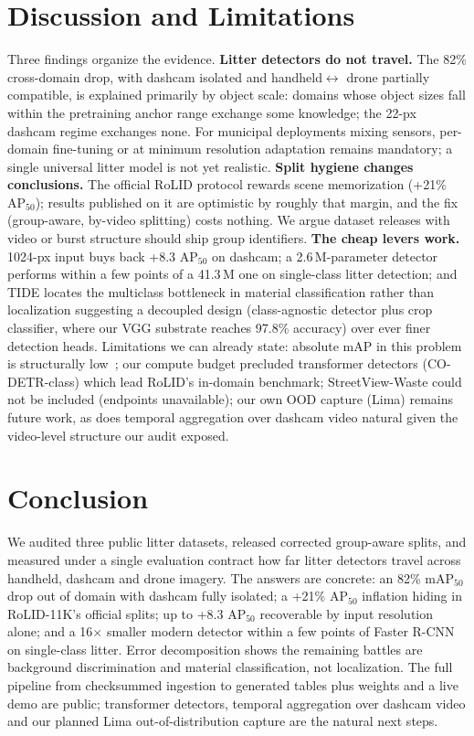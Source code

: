 \documentclass[conference]{IEEEtran}
\begin{document}
\section{Discussion and Limitations}
Three findings organize the evidence. \textbf{Litter detectors do not travel.}
The 82\% cross-domain drop, with dashcam isolated and handheld$\leftrightarrow$
drone partially compatible, is explained primarily by object scale: domains
whose object sizes fall within the pretraining anchor range exchange some
knowledge; the 22-px dashcam regime exchanges none. For municipal deployments
mixing sensors, per-domain fine-tuning or at minimum resolution
adaptation remains mandatory; a single universal litter model is not yet
realistic. \textbf{Split hygiene changes conclusions.} The official RoLID
protocol rewards scene memorization (+21\% AP$_{50}$); results published on it
are optimistic by roughly that margin, and the fix (group-aware, by-video
splitting) costs nothing. We argue dataset releases with video or burst
structure should ship group identifiers. \textbf{The cheap levers work.}
1024-px input buys back +8.3 AP$_{50}$ on dashcam; a 2.6\,M-parameter detector
performs within a few points of a 41.3\,M one on single-class litter detection;
and TIDE locates the multiclass bottleneck in material classification rather
than localization suggesting a decoupled design (class-agnostic detector plus
crop classifier, where our VGG substrate reaches 97.8\% accuracy) over ever
finer detection heads.
Limitations we can already state: absolute mAP in this problem is structurally
low~\cite{trashdet}; our compute budget precluded transformer detectors
(CO-DETR-class) which lead RoLID's in-domain benchmark; StreetView-Waste could
not be included (endpoints unavailable); our own OOD capture (Lima) remains
future work, as does temporal aggregation over dashcam video natural given the
video-level structure our audit exposed.

\section{Conclusion}
We audited three public litter datasets, released corrected group-aware splits,
and measured under a single evaluation contract how far litter detectors
travel across handheld, dashcam and drone imagery. The answers are concrete: an
82\% mAP$_{50}$ drop out of domain with dashcam fully isolated; a +21\%
AP$_{50}$ inflation hiding in RoLID-11K's official splits; up to +8.3
AP$_{50}$ recoverable by input resolution alone; and a 16$\times$ smaller
modern detector within a few points of Faster R-CNN on single-class litter.
Error decomposition shows the remaining battles are background discrimination
and material classification, not localization. The full pipeline from
checksummed ingestion to generated tables plus weights and a live demo are
public; transformer detectors, temporal aggregation over dashcam video and our
planned Lima out-of-distribution capture are the natural next steps.
\end{document}
